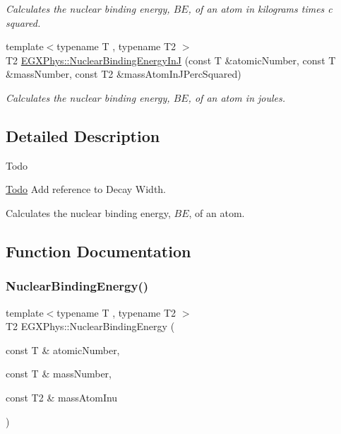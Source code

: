 \begin{DoxyCompactItemize}
\begin{DoxyCompactList}\small\item\em Calculates the nuclear binding energy, $BE$, of an atom in kilograms times c squared. \end{DoxyCompactList}\item 
{\footnotesize template$<$typename T , typename T2 $>$ }\\T2 \mbox{\hyperlink{group___e_g_x_phys-_nuclear_binding_energy_gae48a95188d9b71b36d02babf227b9449}{E\+G\+X\+Phys\+::\+Nuclear\+Binding\+Energy\+InJ}} (const T \&atomic\+Number, const T \&mass\+Number, const T2 \&mass\+Atom\+In\+J\+Perc\+Squared)
\begin{DoxyCompactList}\small\item\em Calculates the nuclear binding energy, $BE$, of an atom in joules. \end{DoxyCompactList}\end{DoxyCompactItemize}


\subsection{Detailed Description}
\begin{DoxyRefDesc}{Todo}
\item[\mbox{\hyperlink{todo__todo000006}{Todo}}]Add reference to Decay Width. \end{DoxyRefDesc}


Calculates the nuclear binding energy, $BE$, of an atom. 

\subsection{Function Documentation}
\mbox{\label{group___e_g_x_phys-_nuclear_binding_energy_gab6832bf15ead7b4e867e759e0a2a078e}} 
\subsubsection{\texorpdfstring{Nuclear\+Binding\+Energy()}{NuclearBindingEnergy()}}
{\footnotesize\ttfamily template$<$typename T , typename T2 $>$ \\
T2 E\+G\+X\+Phys\+::\+Nuclear\+Binding\+Energy (\begin{DoxyParamCaption}\item[{const T \&}]{atomic\+Number,  }\item[{const T \&}]{mass\+Number,  }\item[{const T2 \&}]{mass\+Atom\+Inu }\end{DoxyParamCaption})}



